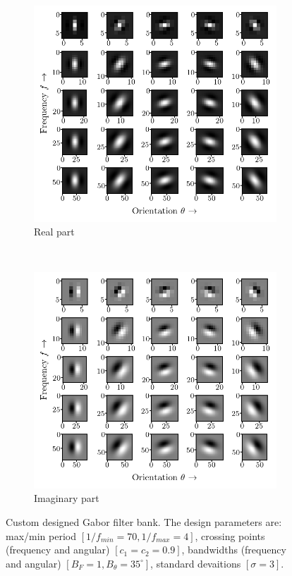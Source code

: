 \documentclass[journal]{IEEEtran}
\begin{document}
\begin{figure}[!ht]
	\centering
	\begin{subfigure}[b]{0.4\textwidth}
		\includegraphics[width=\textwidth]{GaborFilterbank_spatial_2d_real}
		\caption{Real part}
		\label{fig:2d_filterbank_real}
	\end{subfigure}\\
	\begin{subfigure}[b]{0.4\textwidth}
		\centering
		\includegraphics[width=\textwidth]{GaborFilterbank_spatial_2d_imag}
		\caption{Imaginary part}
		\label{fig:2d_filterbank_imag}
	\end{subfigure}
	    
    \caption{Custom designed Gabor filter bank. The design parameters are: max/min period $[1/f_{min}=70, 1/f_{max}=4]$, crossing points (frequency and angular) $[c_1=c_2= 0.9]$, bandwidths (frequency and angular) $[B_F=1, B_{\theta} = 35^{\circ}]$, standard devaitions $[\sigma=3]$.}\label{fig:2d_filterbank}
\end{figure}
\end{document}
